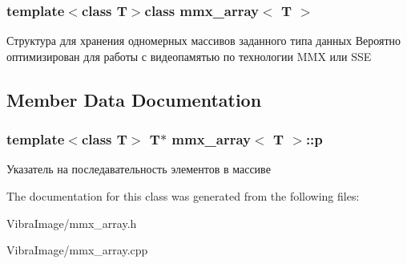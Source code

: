 \subsubsection*{template$<$class T$>$class mmx\+\_\+array$<$ T $>$}

Структура для хранения одномерных массивов заданного типа данных Вероятно оптимизирован для работы с видеопамятью по технологии M\+M\+X или S\+S\+E 



\subsection{Member Data Documentation}
\hypertarget{classmmx__array_ad960c2e84c1717258f9c9527b0d339b2}{
\subsubsection[{p}]{\setlength{\rightskip}{0pt plus 5cm}template$<$class T$>$ T$\ast$ {\bf mmx\+\_\+array}$<$ T $>$\+::p}}\label{classmmx__array_ad960c2e84c1717258f9c9527b0d339b2}


Указатель на последавательность элементов в массиве 



The documentation for this class was generated from the following files\+:\begin{DoxyCompactItemize}
\item 
Vibra\+Image/mmx\+\_\+array.\+h\item 
Vibra\+Image/mmx\+\_\+array.\+cpp\end{DoxyCompactItemize}
